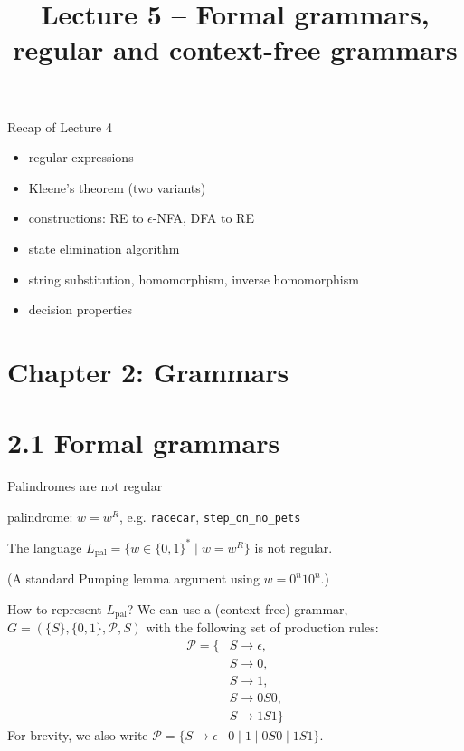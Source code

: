 \documentclass[handout]{beamer}
\title{Lecture 5 -- Formal grammars, regular and context-free grammars}
\begin{document}
\frame{\titlepage}


\begin{frame}{Recap of Lecture 4}

    \begin{itemize}
        \item regular expressions
        \item Kleene's theorem (two variants)
        \item constructions: RE to $\epsilon$-NFA, DFA to RE
        \item state elimination algorithm
        \item string substitution, homomorphism, inverse homomorphism
        \item decision properties
    \end{itemize}

\end{frame}


\section{\sc Chapter 2: Grammars}


\section{2.1 Formal grammars}


\begin{frame}{Palindromes are not regular}

    \alert{palindrome}: $w=w^R$, e.g. \texttt{racecar}, \texttt{step\_on\_no\_pets}

    \begin{example}
        The language $L_\mathrm{pal}=\{w\in\{0,1\}^*\mid w=w^R\}$ is not regular.

        (A standard Pumping lemma argument using $w=0^n10^n$.)
    \end{example}    

    How to represent $L_\mathrm{pal}$? We can use a (\alert{context-free}) \alert{grammar},     
    $G=(\{S\},\{0,1\},\mathcal P,S)$ with the following set of \alert{production rules}:
    \begin{align*}
        \mathcal P=\{&S\rightarrow \epsilon,\\
        &S\rightarrow 0,\\
        &S\rightarrow 1,\\
        &S\rightarrow 0S0,\\
        &S\rightarrow 1S1\}
    \end{align*}
	For brevity, we also write $\mathcal P=\{S\rightarrow \epsilon\mid 0\mid 1\mid 0S0\mid 1S1\}$.

\end{frame}
\end{document}

